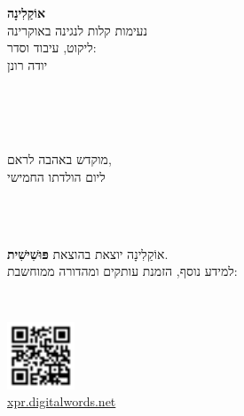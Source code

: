 \begin{titlepage}

\dulingvaujo
{
	\begin{center}
		\textbf{אוֹקַלִינָה}\\
		נעימות קלות לנגינה באוקרינה\\[1ex]
		ליקוט, עיבוד וסדר:\\יודה רונן
	\end{center}
}
{
	\begin{center}
		\\
		\\[1ex]
		\\
	\end{center}
}

\apartigilo

\dulingvaujo
{
	\begin{center}
		מוקדש באהבה לראם,\\
		ליום הולדתו החמישי\\
	\end{center}
}
{
	\begin{center}
		\\
		\\
	\end{center}
}

\apartigilo

\dulingvaujo
{
	\begin{center}
		אוֹקַלִינָה יוצאת בהוצאת \textbf{פּוּשִׁישִׁית}.\\
		למידע נוסף, הזמנת עותקים ומהדורה ממוחשבת:
	\end{center}
}
{
	\begin{center}
		\\
	\end{center}
}

\begin{center}
	\includegraphics[width=2.0cm]{"retejo.png"}\\
	\url{xpr.digitalwords.net}


\end{center}
\end{titlepage}
